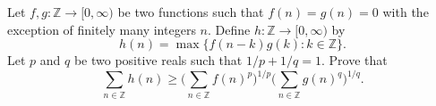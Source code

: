 Let $f, g:\mathbb{Z}\rightarrow [0,\infty )$ be two functions such that $f(n)=g(n)=0$ with the exception of finitely many integers $n$. Define $h:\mathbb{Z}\rightarrow [0,\infty )$ by \[h(n)=\max \{f(n-k)g(k): k\in\mathbb{Z}\}.\] Let $p$ and $q$ be two positive reals such that $1/p+1/q=1$. Prove that \[ \sum_{n\in\mathbb{Z}}h(n)\geq \Bigg(\sum_{n\in\mathbb{Z}}f(n)^p\Bigg)^{1/p}\Bigg(\sum_{n\in\mathbb{Z}}g(n)^q\Bigg)^{1/q}.\]
